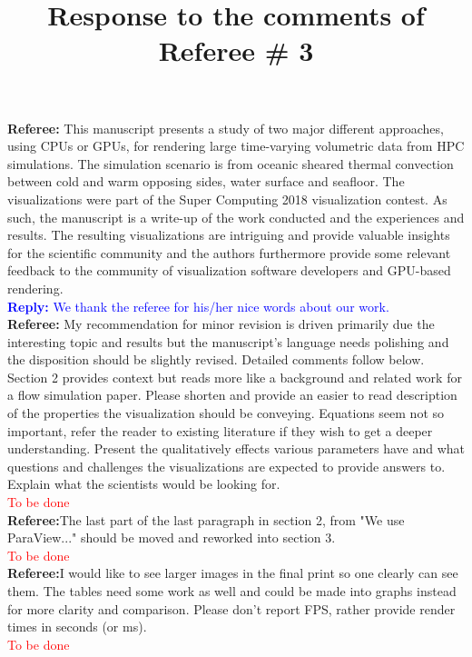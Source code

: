 \documentclass[]{article}
\title{Response to the comments of Referee \# 3}
\begin{document}
\maketitle
\textbf{Referee:} This manuscript presents a study of two major different approaches, using CPUs or GPUs, for rendering large time-varying volumetric data from HPC simulations. The simulation scenario is from oceanic sheared thermal convection between cold and warm opposing sides, water surface and seafloor. The visualizations were part of the Super Computing 2018 visualization contest. As such, the manuscript is a write-up of the work conducted and the experiences and results.
The resulting visualizations are intriguing and provide valuable insights for the scientific community and the authors furthermore provide some relevant feedback to the community of visualization software developers and GPU-based rendering. \\
\textcolor{blue}{\textbf{Reply:} We thank the referee for his/her nice words about our work.} \\

\textbf{Referee:} My recommendation for minor revision is driven primarily due the interesting topic and results but the manuscript's language needs polishing and the disposition should be slightly revised. Detailed comments follow below.
Section 2 provides context but reads more like a background and related work for a flow simulation paper. Please shorten and provide an easier to read description of the properties the visualization should be conveying. Equations seem not so important, refer the reader to existing literature if they wish to get a deeper understanding. Present the qualitatively effects various parameters have and what questions and challenges the visualizations are expected to provide answers to. Explain what the scientists would be looking for. \\
\textcolor{red}{To be done} \\

\textbf{Referee:}The last part of the last paragraph in section 2, from "We use ParaView..." should be moved and reworked into section 3. \\
\textcolor{red}{To be done} \\

\textbf{Referee:}I would like to see larger images in the final print so one clearly can see them. The tables need some work as well and could be made into graphs instead for more clarity and comparison. Please don't report FPS, rather provide render times in seconds (or ms). \\
\textcolor{red}{To be done} \\
\end{document}
